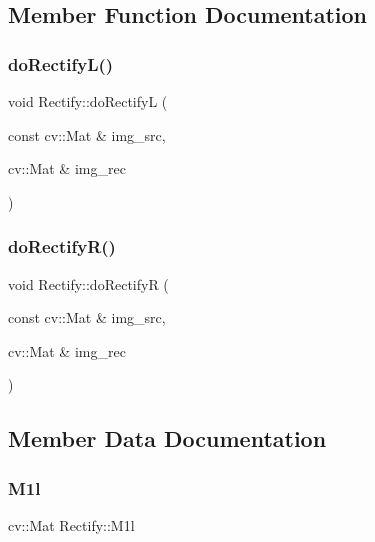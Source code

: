 \subsection{Member Function Documentation}
\mbox{\label{class_rectify_ab13cffcfad378e7fe0e2acc30b34b898}} 
\subsubsection{\texorpdfstring{do\+Rectify\+L()}{doRectifyL()}}
{\footnotesize\ttfamily void Rectify\+::do\+RectifyL (\begin{DoxyParamCaption}\item[{const cv\+::\+Mat \&}]{img\+\_\+src,  }\item[{cv\+::\+Mat \&}]{img\+\_\+rec }\end{DoxyParamCaption})}

\mbox{\label{class_rectify_a730bcf1354cf3235bc968e6614fac588}} 
\subsubsection{\texorpdfstring{do\+Rectify\+R()}{doRectifyR()}}
{\footnotesize\ttfamily void Rectify\+::do\+RectifyR (\begin{DoxyParamCaption}\item[{const cv\+::\+Mat \&}]{img\+\_\+src,  }\item[{cv\+::\+Mat \&}]{img\+\_\+rec }\end{DoxyParamCaption})}



\subsection{Member Data Documentation}
\mbox{\label{class_rectify_a2bccf95a2c08fd34ecba598b6ace5f3b}} 
\subsubsection{\texorpdfstring{M1l}{M1l}}
{\footnotesize\ttfamily cv\+::\+Mat Rectify\+::\+M1l}

